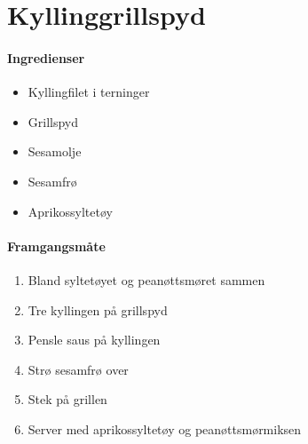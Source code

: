 \section{﻿Kyllinggrillspyd}

\paragraph{Ingredienser}
\begin{itemize}[noitemsep]
	\item Kyllingfilet i terninger
	\item Grillspyd
	\item Sesamolje
	\item Sesamfrø
	\item Aprikossyltetøy
\end{itemize}

\paragraph{Framgangsmåte}
\begin{enumerate}[noitemsep]
	\item Bland syltetøyet og peanøttsmøret sammen
	\item Tre kyllingen på grillspyd
	\item Pensle saus på kyllingen
	\item Strø sesamfrø over
	\item Stek på grillen
	\item Server med aprikossyltetøy og peanøttsmørmiksen
\end{enumerate}
